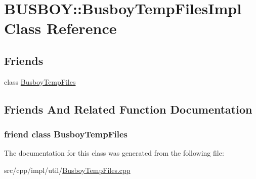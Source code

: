 \hypertarget{classBUSBOY_1_1BusboyTempFilesImpl}{
\section{BUSBOY::BusboyTempFilesImpl Class Reference}
\label{classBUSBOY_1_1BusboyTempFilesImpl}
}
\subsection*{Friends}
\begin{DoxyCompactItemize}
\item 
class \hyperlink{classBUSBOY_1_1BusboyTempFilesImpl_acd452d22e572b7f69b923a02924b93c0}{BusboyTempFiles}
\end{DoxyCompactItemize}


\subsection{Friends And Related Function Documentation}
\hypertarget{classBUSBOY_1_1BusboyTempFilesImpl_acd452d22e572b7f69b923a02924b93c0}{
\subsubsection[{BusboyTempFiles}]{\setlength{\rightskip}{0pt plus 5cm}friend class {\bf BusboyTempFiles}}}
\label{classBUSBOY_1_1BusboyTempFilesImpl_acd452d22e572b7f69b923a02924b93c0}


The documentation for this class was generated from the following file:\begin{DoxyCompactItemize}
\item 
src/cpp/impl/util/\hyperlink{BusboyTempFiles_8cpp}{BusboyTempFiles.cpp}\end{DoxyCompactItemize}

